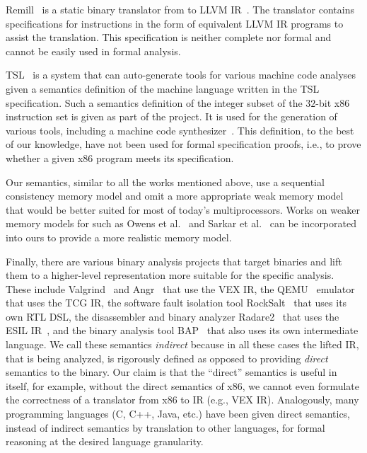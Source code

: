Remill~\cite{McSema:Recon14} is a static binary translator from \ISA to LLVM
IR~\cite{LLVM:CGO04}. The translator contains specifications for \ISA instructions
in the form of equivalent LLVM IR programs to assist the translation. This
specification is neither complete nor formal and cannot be easily used
in formal analysis.

TSL~\cite{TSL:TOPLAS13} is a system that can auto-generate tools for
various machine code analyses given a semantics definition of the machine
language written in the TSL specification. Such a semantics
definition of the integer subset of the $32$-bit x86 instruction set is given
as part of the project. It is used for the generation of
various tools, including a machine code synthesizer~\cite{Srinivasan2015}.
This definition, to the best of our knowledge, have not been used
for formal specification proofs, i.e., to prove whether a given x86
program meets its specification.

Our semantics, similar to all the works mentioned above, use a sequential
consistency memory model and omit a more appropriate weak memory model
that would be better suited for most of today's multiprocessors.
Works on
weaker memory models for \ISA such as
Owens et al.~\cite{Owens:x86-TSO} and Sarkar et al.~\cite{Sarkar:POPL09} can be
incorporated into ours to provide a more realistic memory model.

Finally, there are various binary analysis projects that target \ISA binaries
and lift them to a higher-level representation more suitable for the
specific analysis. These include Valgrind~\cite{Valgrind:ENTCS03} and
Angr~\cite{Angr} that use the VEX IR, the QEMU~\cite{QEMU:USENIX05} emulator
that uses the TCG IR, the software fault isolation tool
RockSalt~\cite{Roclsalt:PLDI12} that uses its own RTL DSL, the disassembler and
binary analyzer Radare2~\cite{Radare2} that uses the ESIL IR~\cite{ESIL},
and the binary analysis
tool BAP~\cite{BAP:CAV11} that also uses its own intermediate language.
We call these semantics \emph{indirect} because in all these
cases the lifted IR, that is being analyzed, is rigorously defined as opposed to providing \emph{direct} semantics to the binary. Our claim is that the ``direct'' semantics is useful in itself, for example, without the direct semantics of x86, we cannot even formulate the correctness of a translator from x86 to IR (e.g., VEX IR).  Analogously, many programming languages (C, C++, Java, etc.) have been given direct semantics, instead of indirect semantics by translation to other languages, for formal reasoning at the desired language granularity. 

